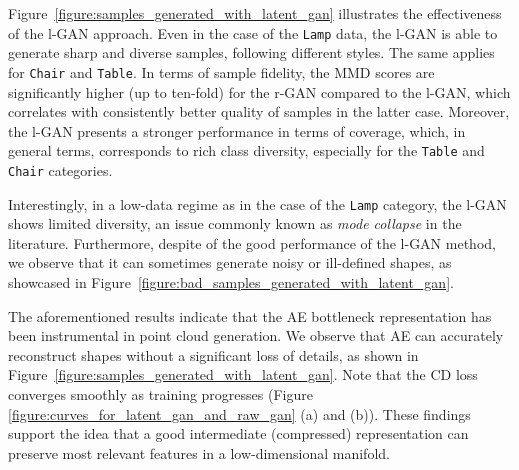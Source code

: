 \documentclass[12pt]{article}
\begin{document}
    Figure~\ref{figure:samples_generated_with_latent_gan} illustrates the effectiveness of the l-GAN approach. Even in the case of the \verb|Lamp| data, the l-GAN is able to generate sharp and diverse samples, following different styles. The same applies for \verb|Chair| and \verb|Table|. In terms of sample fidelity, the MMD scores are significantly higher (up to ten-fold) for the r-GAN compared to the l-GAN, which correlates with consistently better quality of samples in the latter case. Moreover, the l-GAN presents a stronger performance in terms of coverage, which, in general terms, corresponds to rich class diversity, especially for the \verb|Table| and \verb|Chair| categories.

    Interestingly, in a low-data regime as in the case of the \verb|Lamp| category, the l-GAN shows limited diversity, an issue commonly known as \textit{mode collapse} in the literature. Furthermore, despite of the good performance of the l-GAN method, we observe that it can sometimes generate noisy or ill-defined shapes, as showcased in Figure~\ref{figure:bad_samples_generated_with_latent_gan}.

    The aforementioned results indicate that the AE bottleneck representation has been instrumental in point cloud generation. We observe that AE can accurately reconstruct shapes without a significant loss of details, as shown in Figure~\ref{figure:samples_generated_with_latent_gan}. Note that the CD loss converges smoothly as training progresses (Figure \ref{figure:curves_for_latent_gan_and_raw_gan} (a) and (b)). These findings support the idea that a good intermediate (compressed) representation can preserve most relevant features in a low-dimensional manifold.
\end{document}
